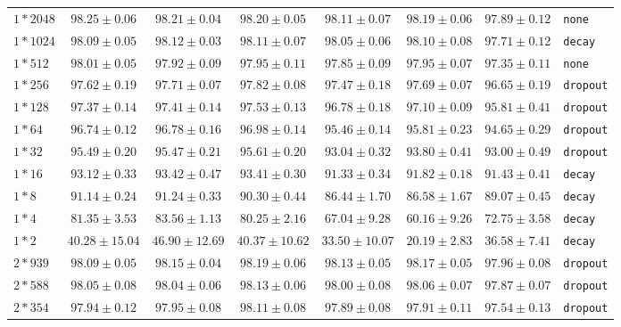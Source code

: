 \documentclass[conference]{IEEEtran}
\begin{document}
\begin{longtable}{@{}lccccccl@{}}
$1*2048$ & \bfseries $98.25 \pm 0.06$ & $98.21 \pm 0.04$ & $98.20 \pm 0.05$ & $98.11 \pm 0.07$ & $98.19 \pm 0.06$ & $97.89 \pm 0.12$ & \texttt{none} \\
$1*1024$ & $98.09 \pm 0.05$ & \bfseries $98.12 \pm 0.03$ & $98.11 \pm 0.07$ & $98.05 \pm 0.06$ & $98.10 \pm 0.08$ & $97.71 \pm 0.12$ & \texttt{decay} \\
$1*512$ & \bfseries $98.01 \pm 0.05$ & $97.92 \pm 0.09$ & $97.95 \pm 0.11$ & $97.85 \pm 0.09$ & $97.95 \pm 0.07$ & $97.35 \pm 0.11$ & \texttt{none} \\
$1*256$ & $97.62 \pm 0.19$ & $97.71 \pm 0.07$ & \bfseries $97.82 \pm 0.08$ & $97.47 \pm 0.18$ & $97.69 \pm 0.07$ & $96.65 \pm 0.19$ & \texttt{dropout} \\
$1*128$ & $97.37 \pm 0.14$ & $97.41 \pm 0.14$ & \bfseries $97.53 \pm 0.13$ & $96.78 \pm 0.18$ & $97.10 \pm 0.09$ & $95.81 \pm 0.41$ & \texttt{dropout} \\
$1*64$ & $96.74 \pm 0.12$ & $96.78 \pm 0.16$ & \bfseries $96.98 \pm 0.14$ & $95.46 \pm 0.14$ & $95.81 \pm 0.23$ & $94.65 \pm 0.29$ & \texttt{dropout} \\
$1*32$ & $95.49 \pm 0.20$ & $95.47 \pm 0.21$ & \bfseries $95.61 \pm 0.20$ & $93.04 \pm 0.32$ & $93.80 \pm 0.41$ & $93.00 \pm 0.49$ & \texttt{dropout} \\
$1*16$ & $93.12 \pm 0.33$ & \bfseries $93.42 \pm 0.47$ & $93.41 \pm 0.30$ & $91.33 \pm 0.34$ & $91.82 \pm 0.18$ & $91.43 \pm 0.41$ & \texttt{decay} \\
$1*8$ & $91.14 \pm 0.24$ & \bfseries $91.24 \pm 0.33$ & $90.30 \pm 0.44$ & $86.44 \pm 1.70$ & $86.58 \pm 1.67$ & $89.07 \pm 0.45$ & \texttt{decay} \\
$1*4$ & $81.35 \pm 3.53$ & \bfseries $83.56 \pm 1.13$ & $80.25 \pm 2.16$ & $67.04 \pm 9.28$ & $60.16 \pm 9.26$ & $72.75 \pm 3.58$ & \texttt{decay} \\
$1*2$ & $40.28 \pm 15.04$ & \bfseries $46.90 \pm 12.69$ & $40.37 \pm 10.62$ & $33.50 \pm 10.07$ & $20.19 \pm 2.83$ & $36.58 \pm 7.41$ & \texttt{decay} \\
$2*939$ & $98.09 \pm 0.05$ & $98.15 \pm 0.04$ & \bfseries $98.19 \pm 0.06$ & $98.13 \pm 0.05$ & $98.17 \pm 0.05$ & $97.96 \pm 0.08$ & \texttt{dropout} \\
$2*588$ & $98.05 \pm 0.08$ & $98.04 \pm 0.06$ & \bfseries $98.13 \pm 0.06$ & $98.00 \pm 0.08$ & $98.06 \pm 0.07$ & $97.87 \pm 0.07$ & \texttt{dropout} \\
$2*354$ & $97.94 \pm 0.12$ & $97.95 \pm 0.08$ & \bfseries $98.11 \pm 0.08$ & $97.89 \pm 0.08$ & $97.91 \pm 0.11$ & $97.54 \pm 0.13$ & \texttt{dropout} \\

\end{longtable}
\end{document}
